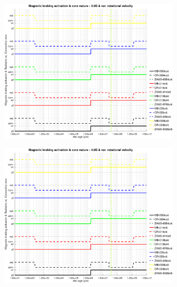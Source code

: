 \documentclass[fleqn,usenatbib]{mnras}
\begin{document}
\begin{figure}
    \centering
    \begin{subfigure}[h]{0.47\textwidth}
    \includegraphics[trim = 30mm 15mm 20mm 15mm, clip,width=\textwidth]{figures/mb_act_var_vel_3_5g.eps}
    \label{fig:subim31}
    \end{subfigure}
    \begin{subfigure}[h]{0.47\textwidth}
    \includegraphics[trim = 30mm 15mm 20mm 15mm, clip,width=\textwidth]{figures/mb_act_var_vel_4_0g.eps}
    \label{fig:subim32}
    \end{subfigure}
    \begin{subfigure}[h]{0.47\textwidth}

\end{subfigure}
\end{figure}
\end{document}
